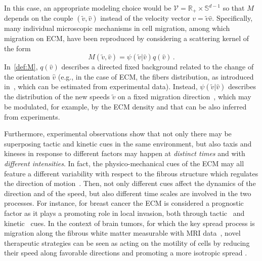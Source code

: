 \documentclass[a4paper]{article}
\theoremstyle{Theorem}\newtheorem{proposition}{Proposition}[section]
\theoremstyle{Remark}\newtheorem{remark}{Remark}[section]
\theoremstyle{Theorem}\newtheorem{theorem}{Theorem}[section]
\newcommand{\R}{\mathbb{R}}
\newcommand{\hv}{\hat{v}}
\newcommand{\tv}{\tilde{v}}
\begin{document}
In this case, an appropriate modeling choice would be  $\mathcal{V}=\R_+\times\mathbb{S}^{d-1}$ so that $M$ depends on the couple $(\tv,\hv)$ instead of the velocity vector $v=\tv\hv$. Specifically, many individual microscopic mechanisms in cell migration, among which migration on ECM, have been reproduced by considering a scattering kernel of the form
\begin{equation}\label{def:M}
    M(\tv,\hv)=\psi(\tv|\hv) q(\hv)\,.
\end{equation}
In~\eqref{def:M}, $q(\hv)$ describes a directed fixed background related to the change of the orientation $\hv$ (e.g., in the case of ECM, the fibers distribution, as introduced in~\cite{hillen2006JMB}, which can be estimated from experimental data). Instead, $\psi(\tv|\hv)$  describes the distribution of the new speeds $\tv$ on a fixed migration direction~\cite{loy2019JMB,conte2023SIAP}, which may be modulated, for example, by the ECM density and that can be also inferred from experiments.   

Furthermore, experimental observations show that not only there may be superposing tactic and kinetic cues in the same environment, but also taxis and kineses in response to different factors may happen at \textit{distinct times} and with \textit{different intensities}. In fact, the physico-mechanical cues of the ECM may all feature a different variability with respect to the fibrous structure which regulates the direction of motion~\cite{Taufalele2019PLOSONE,Condor,Lang,Yamada2019IJEP}. Then, not only different cues affect the dynamics of the direction and of the speed, but also different time scales are involved in the two processes. For instance, for breast cancer the ECM is considered a prognostic factor as it plays a promoting role in local invasion, both through tactic~\cite{provenzano2006collagen} and kinetic~\cite{provenzano2008collagen} cues. In the context of brain tumors, for which the key spread process is migration along the fibrous white matter measurable with MRI data~\cite{conte2020glioma}, novel therapeutic strategies can be seen as acting on the motility of cells by reducing their speed along favorable directions and promoting a more isotropic spread \cite{brooks2021white}.





\end{document}
